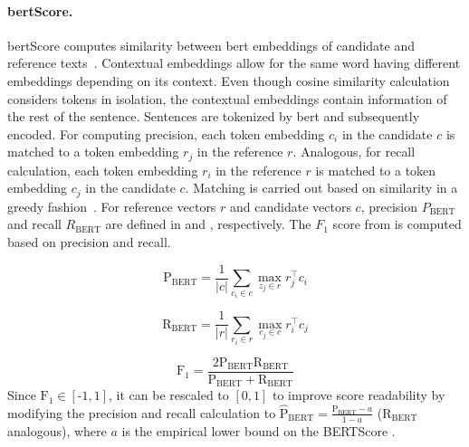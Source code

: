 \paragraph{\acs{bert}Score.}
\acs{bert}Score computes similarity between \ac{bert} embeddings of candidate and reference texts~\citep{hanna_fine_grained_2021}. 
Contextual embeddings allow for the same word having different embeddings depending on its context.
Even though cosine similarity calculation considers tokens in isolation, the contextual embeddings contain information of the rest of the sentence.
Sentences are tokenized by \ac{bert} and subsequently encoded.
For computing precision, each token embedding $c_i$ in the candidate $c$ is matched to a token embedding $r_j$ in the reference $r$.
Analogous, for recall calculation, each token embedding $r_i$ in the reference $r$ is matched to a token embedding $c_j$ in the candidate $c$.
Matching is carried out based on similarity in a greedy fashion~\citep{zhang_bertscore_2020}.
For reference vectors $r$ and candidate vectors $c$, precision $P_{\text{BERT}}$ and recall $R_{\text{BERT}}$ are defined in  and , respectively.
The $F_1$ score from  is computed based on precision and recall.

\begin{equation}
    \operatorname{P_{BERT}} = \frac{1}{|c|} \sum_{c_i \in c} \max_{z_j \in r} r_j^\top c_i
\label{eq:bert_p}
\end{equation}

\begin{equation}
    \operatorname{R_{BERT}} = \frac{1}{|r|} \sum_{r_i \in r} \max_{c_j \in c} r_i^\top c_j
\label{eq:bert_r}
\end{equation}

\begin{equation}
    \operatorname{F_1} = \frac{2  \operatorname{P_{BERT}}  \operatorname{R_{BERT}}}{\operatorname{P_{BERT}} + \operatorname{R_{BERT}}} 
\label{eq:bert_f1}
\end{equation}
Since $\operatorname{F_1} \in \left[\text{-}1,1\right]$, it can be rescaled to $[0,1]$ to improve score readability by modifying the precision and recall calculation 
to $\mathrm{\hat{P}_{BERT}} = \frac{\operatorname{P_{BERT}} - a}{1 - a}$ ($\operatorname{R_{BERT}}$ analogous), where $a$ is the empirical lower bound on the BERTScore \citep{zhang_bertscore_2020,hanna_fine_grained_2021}.


